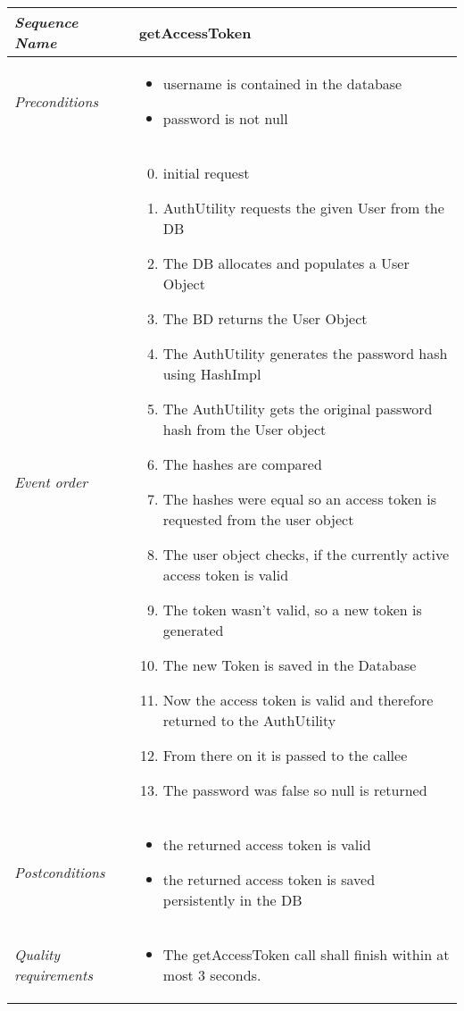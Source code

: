 				\begin{tabular}{|p{}|p{}|}
					\hline 
					\textit{Sequence Name}&\textbf{getAccessToken}\\
					\hline
					\textit{Preconditions}&
					\begin{itemize}
						\item username is contained in the database
						\item password is not null
					\end{itemize}\\
					\hline
					\textit{Event order}&
					\begin{enumerate}[label*=1.\arabic*]
						\setcounter{enumi}{-1}
						\item initial request
						\item AuthUtility requests the given User from the DB
						\item The DB allocates and populates a User Object
						\item The BD returns the User Object
						\item The AuthUtility generates the password hash using HashImpl
						\addtocounter{enumi}{1}
						\item The AuthUtility gets the original password hash from the User object
						\addtocounter{enumi}{1}
						\item The hashes are compared
						\item The hashes were equal so an access token is requested from the user object
						\item The user object checks, if the currently active access token is valid
						\item The token wasn't valid, so a new token is generated
						\item The new Token is saved in the Database
						\item Now the access token is valid and therefore returned to the AuthUtility
						\item From there on it is passed to the callee
						\item The password was false so null is returned
					\end{enumerate}\\
					\hline
					\textit{Postconditions}&
					\begin{itemize}
						\item the returned access token is valid
						\item the returned access token is saved persistently in the DB
					\end{itemize}\\
					\hline
					\textit{Quality requirements}&
					\begin{itemize}
						\item The getAccessToken call shall finish within at most 3 seconds.
					\end{itemize}\\
					\hline
				\end{tabular}

